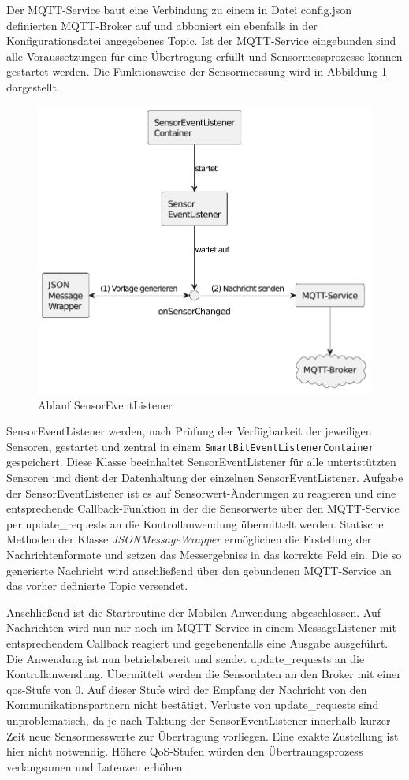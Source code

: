 \documentclass[11pt,a4paper]{report}
\begin{document}
Der MQTT-Service baut eine Verbindung zu einem in Datei config.json definierten MQTT-Broker auf und abboniert ein ebenfalls in der Konfigurationsdatei angegebenes Topic.
Ist der MQTT-Service eingebunden sind alle Voraussetzungen für eine Übertragung erfüllt und  Sensormessprozesse können gestartet werden.
Die Funktionsweise der Sensormeessung wird in Abbildung \ref{fig:sensor_event_listener} dargestellt.
\begin{figure}[htbp]
  \centering
  \includegraphics[width=.8\textwidth]{images/sensor_event_listener}
  \caption{Ablauf SensorEventListener}
  \label{fig:sensor_event_listener}
\end{figure}
SensorEventListener werden, nach Prüfung der Verfügbarkeit der jeweiligen Sensoren, gestartet und zentral in einem \texttt{SmartBitEventListenerContainer} gespeichert.
Diese Klasse beeinhaltet SensorEventListener für alle untertstützten Sensoren und dient der Datenhaltung der einzelnen SensorEventListener.
Aufgabe der SensorEventListener ist es auf Sensorwert-Änderungen zu reagieren und eine entsprechende Callback-Funktion in der die Sensorwerte über den MQTT-Service per update\_requests an die Kontrollanwendung übermittelt werden.
Statische Methoden der Klasse \textit{JSONMessageWrapper} ermöglichen die Erstellung der Nachrichtenformate und setzen das Messergebniss in das korrekte Feld ein.
Die so generierte Nachricht wird anschließend über den gebundenen MQTT-Service an das vorher definierte Topic versendet.

Anschließend ist die Startroutine der Mobilen Anwendung abgeschlossen.
Auf Nachrichten wird nun nur noch im MQTT-Service in einem MessageListener mit entsprechendem Callback reagiert und gegebenenfalls eine Ausgabe ausgeführt.
Die Anwendung ist nun betriebsbereit und sendet update\_requests an die Kontrollanwendung.
Übermittelt werden die Sensordaten an den Broker mit einer \acrshort{qos}-Stufe von 0.
Auf dieser Stufe wird der Empfang der Nachricht von den Kommunikationspartnern nicht bestätigt.
Verluste von update\_requests sind unproblematisch, da je nach Taktung der SensorEventListener innerhalb kurzer Zeit neue Sensormesswerte zur Übertragung vorliegen.
Eine exakte Zustellung ist hier nicht notwendig.
Höhere QoS-Stufen würden den Übertraungsprozess verlangsamen und Latenzen erhöhen.
\end{document}
